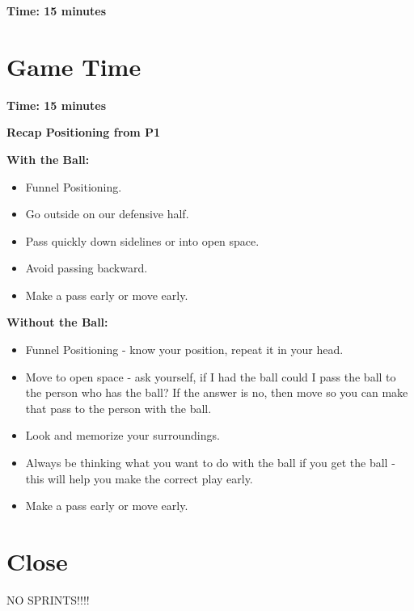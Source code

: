 \documentclass[10pt,letterpaper]{article}
\newenvironment{evenBlock}[1]{%
    \tcolorbox[beamer,%
    noparskip,breakable,
    colback=LightGreen,colframe=DarkGreen,%
    colbacklower=LimeGreen!75!LightGreen,%
    title=#1]}%
    {\endtcolorbox}
\newenvironment{oddBlock}[1]{%
    \tcolorbox[beamer,%
    noparskip,breakable,
    colback=LightBlue,colframe=DarkBlue,%
    colbacklower=DarkBlue!75!LightBlue,%
    title=#1]}%
    {\endtcolorbox}
\begin{document}
\textbf{Time: 15 minutes}


%

\section{Game Time}

\textbf{Time: 15 minutes}

\begin{evenBlock}{Small Sided Game}
    
    \textbf{Recap Positioning from P1}

    \textbf{With the Ball:}
    
    \begin{itemize}
        \setlength{\itemsep}{0pt}
        \setlength{\parskip}{0pt}
        \setlength{\parsep}{0pt}
        \item Funnel Positioning.
        \item Go outside on our defensive half.
        \item Pass quickly down sidelines or into open space.
        \item Avoid passing backward.
        \item Make a pass early or move early.
    \end{itemize}
    \textbf{Without the Ball:}
    \begin{itemize}
        \setlength{\itemsep}{0pt}
        \setlength{\parskip}{0pt}
        \setlength{\parsep}{0pt}
        \item Funnel Positioning - know your position, repeat it in your head.
        \item Move to open space - ask yourself, if I had the ball could I pass the ball to the person who has the ball?  If the answer is no, then move so you can make that pass to the person with the ball.
        \item Look and memorize your surroundings.
        \item Always be thinking what you want to do with the ball if you get the ball - this will help you make the correct play early.
        \item Make a pass early or move early.
    \end{itemize}
\end{evenBlock}

\begin{oddBlock}{Small Sided Game}
\end{oddBlock}

\section{Close}

NO SPRINTS!!!!
\end{document}
